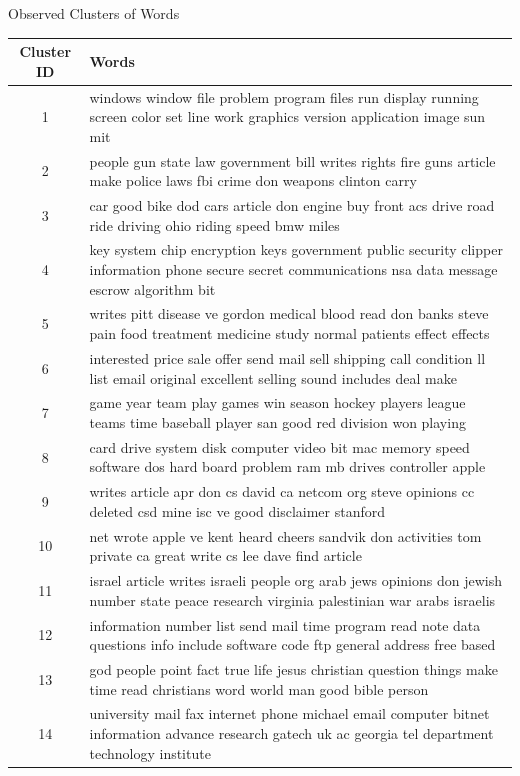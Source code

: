 \documentclass{article}
\begin{document}
\begin{question}
	\begin{qsection}{Observed Clusters of Words}	
		\def\arraystretch{1.8}
		\begin{tabular}[h!]{| c | L |}
			\hline
			\textbf{Cluster ID}	&	\textbf{Words} \\
				& 	windows window file problem program files run display running screen color set line work graphics version application image sun mit \\
			2	& 	people gun state law government bill writes rights fire guns article make police laws fbi crime don weapons clinton carry \\
			3	& 	car good bike dod cars article don engine buy front acs drive road ride driving ohio riding speed bmw miles \\
			4	& 	key system chip encryption keys government public security clipper information phone secure secret communications nsa data message escrow algorithm bit \\
			5	& 	writes pitt disease ve gordon medical blood read don banks steve pain food treatment medicine study normal patients effect effects \\
			6	& 	interested price sale offer send mail sell shipping call condition ll list email original excellent selling sound includes deal make \\
			7	& 	game year team play games win season hockey players league teams time baseball player san good red division won playing \\
			8	& 	card drive system disk computer video bit mac memory speed software dos hard board problem ram mb drives controller apple \\
			9	& 	writes article apr don cs david ca netcom org steve opinions cc deleted csd mine isc ve good disclaimer stanford \\
			10	& 	net wrote apple ve kent heard cheers sandvik don activities tom private ca great write cs lee dave find article \\
			11	& 	israel article writes israeli people org arab jews opinions don jewish number state peace research virginia palestinian war arabs israelis \\
			12	& 	information number list send mail time program read note data questions info include software code ftp general address free based \\
			13	& 	god people point fact true life jesus christian question things make time read christians word world man good bible person \\
			14	& 	university mail fax internet phone michael email computer bitnet information advance research gatech uk ac georgia tel department technology institute \\

\end{tabular}
\end{qsection}
\end{question}
\end{document}
